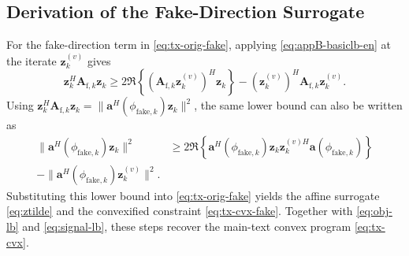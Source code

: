 \documentclass[conference,twocolumn,a4paper]{IEEEtran}
\begin{document}
\subsection{Derivation of the Fake-Direction Surrogate}
For the fake-direction term in \eqref{eq:tx-orig-fake}, applying \eqref{eq:appB-basiclb-en} at the iterate $\mathbf{z}_k^{(v)}$ gives
\begin{equation}
\mathbf{z}_k^H\mathbf{A}_{\mathrm{f},k}\mathbf{z}_k
\ge 2\Re\!\left\{\left(\mathbf{A}_{\mathrm{f},k}\mathbf{z}_k^{(v)}\right)^H\mathbf{z}_k\right\}-\left(\mathbf{z}_k^{(v)}\right)^H\mathbf{A}_{\mathrm{f},k}\mathbf{z}_k^{(v)}.
\label{eq:appB-zlb-en}
\end{equation}
Using $\mathbf{z}_k^H\mathbf{A}_{\mathrm{f},k}\mathbf{z}_k=\|\mathbf{a}^H(\phi_{\mathrm{fake},k})\mathbf{z}_k\|^2$, the same lower bound can also be written as
\begin{align}
\|\mathbf{a}^H(\phi_{\mathrm{fake},k})\mathbf{z}_k\|^2
&\ge 2\Re\!\left\{\mathbf{a}^H(\phi_{\mathrm{fake},k})\mathbf{z}_k\mathbf{z}_k^{(v)H}\mathbf{a}(\phi_{\mathrm{fake},k})\right\} \nonumber\\
-\|\mathbf{a}^H(\phi_{\mathrm{fake},k})\mathbf{z}_k^{(v)}\|^2.
\label{eq:appB-zlb-alt-en}
\end{align}
Substituting this lower bound into \eqref{eq:tx-orig-fake} yields the affine surrogate \eqref{eq:ztilde} and the convexified constraint \eqref{eq:tx-cvx-fake}. Together with \eqref{eq:obj-lb} and \eqref{eq:signal-lb}, these steps recover the main-text convex program \eqref{eq:tx-cvx}.



\end{document}
